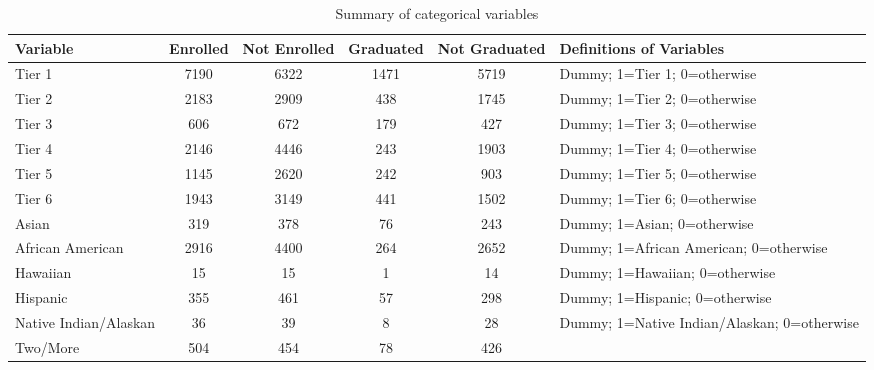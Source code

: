 \documentclass[12pt,english]{report}
\begin{document}
 
\begin{table}
\centering

\caption{Summary of categorical variables}
\label{enroll_discrete}
\begin{adjustbox}{width=1.05\textwidth}

\begin{tabular}{lccccl}
\\[-1.8ex]\hline 
\hline
Variable                        & Enrolled & Not Enrolled & Graduated & Not
Graduated & Definitions of Variables                    \\ \hline
Tier 1                          & 7190    & 6322        & 1471     & 5719      
& Dummy; 1=Tier 1; 0=otherwise                \\ 
Tier 2                          & 2183    & 2909        & 438       & 1745     
& Dummy; 1=Tier 2; 0=otherwise                \\
Tier 3                          & 606      & 672          & 179       & 427    
& Dummy; 1=Tier 3; 0=otherwise                \\
Tier 4                          & 2146    & 4446        & 243       & 1903     
& Dummy; 1=Tier 4; 0=otherwise                \\
Tier 5                          & 1145    & 2620        & 242       & 903      
& Dummy; 1=Tier 5; 0=otherwise                \\
Tier 6                          & 1943    & 3149        & 441       & 1502     
& Dummy; 1=Tier 6; 0=otherwise                \\
Asian                           & 319      & 378          & 76        & 243    
& Dummy; 1=Asian; 0=otherwise                 \\
African American                & 2916    & 4400        & 264       & 2652     
& Dummy; 1=African American; 0=otherwise      \\
Hawaiian                        & 15       & 15           & 1         & 14     
& Dummy; 1=Hawaiian; 0=otherwise              \\
Hispanic                        & 355      & 461          & 57        & 298    
& Dummy; 1=Hispanic; 0=otherwise              \\
Native Indian/Alaskan           & 36       & 39           & 8         & 28     
& Dummy; 1=Native Indian/Alaskan; 0=otherwise \\
Two/More                        & 504      & 454          & 78        & 426    

\end{tabular}
\end{adjustbox}
\end{table}
\end{document}
